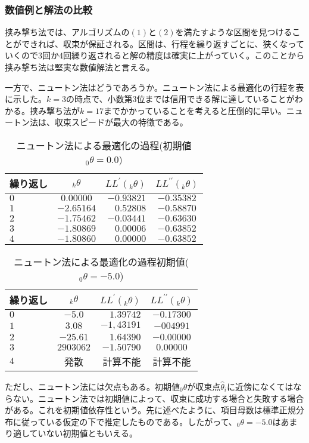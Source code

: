 \documentclass[12pt]{jarticle}
\begin{document}
\subsubsection{数値例と解法の比較}
挟み撃ち法では、アルゴリズムの$(1)$と$(2)$を満たすような区間を見つけることができれば、収束が保証される。区間は、行程を繰り返すごとに、狭くなっていくので$3$回か$4$回繰り返されると解の精度は確実に上がっていく。このことから挟み撃ち法は堅実な数値解法と言える。

一方で、ニュートン法はどうであろうか。ニュートン法による最適化の行程を表に示した。$k = 3$の時点で、小数第$3$位までは信用できる解に達していることがわかる。挟み撃ち法が$k = 17$までかかっていることを考えると圧倒的に早い。ニュートン法は、収束スピードが最大の特徴である。
\begin{table}[H]
  \centering
    \caption{ニュートン法による最適化の過程(初期値$_{0}\theta = 0.0$)}
    \begin{tabular}{|l||c|r|c|}  \hline
      繰り返し & $_{k}\theta$ & $LL^{\prime}(_{k}\theta)$ &  $LL^{\prime\prime}(_{k}\theta)$\\ \hline \hline
      $0$ & $0.00000$ & $-0.93821$ & $-0.35382$ \\ \hline
      $1$ & $-2.65164$ & $0.52808$ & $-0.58870$ \\ \hline
      $2$ & $-1.75462$ & $-0.03441$ & $-0.63630$ \\ \hline
      $3$ & $-1.80869$ & $0.00006$ & $-0.63852$ \\ \hline
      $4$ & $-1.80860$ & $0.00000$ & $-0.63852$ \\ \hline
    \end{tabular}
  \end{table}
  \begin{table}[H]
    \centering
      \caption{ニュートン法による最適化の過程初期値($_{0}\theta = -5.0$)}
      \begin{tabular}{|l||c|r|c|}  \hline
        繰り返し & $_{k}\theta$ & $LL^{\prime}(_{k}\theta)$ &  $LL^{\prime\prime}(_{k}\theta)$\\ \hline \hline
        $0$ & $-5.0$ & $1.39742$ & $-0.17300$ \\ \hline
        $1$ & $3.08$ & $-1,43191$ & $-004991$ \\ \hline
        $2$ & $-25.61$ & $1.64390$ & $-0.00000$ \\ \hline
        $3$ & $2903062$ & $-1.50790$ & $0.00000$ \\ \hline
        $4$ & 発散 & 計算不能 & 計算不能 \\ \hline
      \end{tabular}
    \end{table}
ただし、ニュートン法には欠点もある。初期値$_{0}\theta$が収束点$\hat{\theta}_i$に近傍になくてはならない。ニュートン法では初期値によって、収束に成功する場合と失敗する場合がある。これを初期値依存性という。先に述べたように、項目母数は標準正規分布に従っている仮定の下で推定したものである。したがって、$_{0}\theta = -5.0$はあまり適していない初期値ともいえる。
\end{document}
